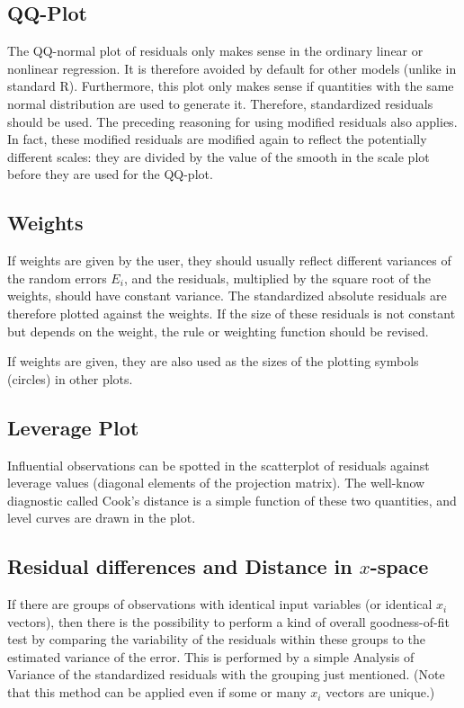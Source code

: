 \documentclass[11pt]{article}
\begin{document}
\subsection{QQ-Plot}
The QQ-normal plot of residuals only makes sense in the ordinary linear or
nonlinear regression. It is therefore avoided by default for other models 
(unlike in standard R).
Furthermore, this plot only makes sense if quantities with the same normal
distribution are used to generate it. 
Therefore, standardized residuals should be used.
The preceding reasoning for using modified residuals also applies.
In fact, these modified residuals are modified again to reflect the
potentially different scales: they are divided by the value of the smooth
in the scale plot before they are used for the QQ-plot.

\subsection{Weights}
If weights are given by the user, they should usually reflect different
variances of the random errors $E_i$, and the residuals, multiplied by the
square root of the weights, should have constant variance.
The standardized absolute residuals are therefore plotted against the weights.
If the size of these residuals is not constant but depends on the weight, 
the rule or weighting function should be revised.

If weights are given, they are also used as the sizes of the plotting
symbols (circles) in other plots.

\subsection{Leverage Plot}
Influential observations can be spotted in the scatterplot of residuals
against leverage values (diagonal elements of the projection matrix).
The well-know diagnostic called Cook's distance is a simple function of
these two quantities, and level curves are drawn in the plot.

\subsection{Residual differences and Distance in $x$-space}
If there are groups of observations with identical input variables
(or identical $x_i$ vectors), then there is the possibility to perform a kind
of overall goodness-of-fit test by comparing the variability of the
residuals within these groups to the estimated variance of the error.
This is performed by a simple Analysis of Variance of the standardized 
residuals with the grouping just mentioned. 
(Note that this method can be applied even if some or many $x_i$ vectors 
are unique.)
\end{document}
